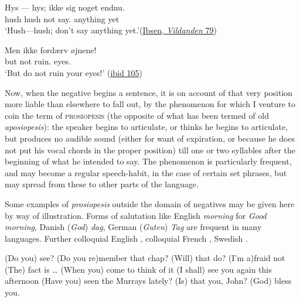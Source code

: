 \ea \label{ex:01-01}
\ea
\gll Hys --- hys; ikke sig noget endnu.\\
hush {} hush not say.\IMP{} anything yet\\
\glt `Hush---hush; don't say anything yet.'\hfill(\href{https://archive.org/details/vildandenskuesp00ibsegoog/page/n87/mode/2up?q=%22ikke+sig+noget+endnu%22&view=theater}{Ibsen, \textit{Vildanden} 79})

\ex
\gll Men ikke fordærv øjnene! \phantom{x}\\
but not ruin.\IMP{} eyes.\DEF{}\\
\glt `But do not ruin your eyes!' \hfill(\href{https://archive.org/details/vildandenskuesp00ibsegoog/page/n113/mode/2up?q=%22Men+ikke+ford%C3%A6rv+%C3%B8jnene%22&view=theater}{ibid 105})
\z
\z{}

Now, when the negative begins a sentence, it is on account of that very position more liable than elsewhere to fall out, by the phenomenon for which I venture to coin the term of \textsc{prosiopesis} (the opposite of what has been termed of old \textit{aposiopesis}): the speaker begins to articulate, or thinks he begins to articulate, but produces no audible sound (either for want of expiration, or because he does not put his vocal chords in the proper position) till one or two syllables after the beginning of what he intended to say. The phenomenon is particularly frequent, and may become a regular speech-habit, in the case of certain set phrases, but may spread from these to other parts of the language.

Some examples of \textit{prosiopesis} outside the domain of negatives may be given here by way of illustration. Forms of salutation like English \textit{morning} for \textit{Good morning}, Danish (\textit{God}) \textit{dag}, German (\textit{Guten}) \textit{Tag} are frequent in many languages. Further colloquial English , colloquial French , Swedish .\largerpage


\ea \label{ex:01-03}
\ea (Do you) see?
\ex (Do you re)member that chap?
\ex (Will) that do?
\ex (I'm a)fraid not
\ex (The) fact is {\dots}
\ex (When you) come to think of it
\ex (I shall) see you again this afternoon
\ex (Have you) seen the Murrays lately?
\ex (Is) that you, John?
\ex (God) bless you. 
\z
\z

